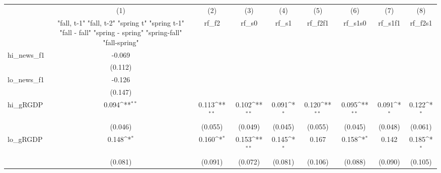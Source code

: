 {
\def\sym#1{\ifmmode^{#1}\else\(^{#1}\)\fi}
\begin{tabular}{l*{8}{c}}
\toprule
            &\multicolumn{1}{c}{(1)}&\multicolumn{1}{c}{(2)}&\multicolumn{1}{c}{(3)}&\multicolumn{1}{c}{(4)}&\multicolumn{1}{c}{(5)}&\multicolumn{1}{c}{(6)}&\multicolumn{1}{c}{(7)}&\multicolumn{1}{c}{(8)}\\
            &\multicolumn{1}{c}{  "fall, t-1" "fall, t-2" "spring t" "spring t-1"  "fall - fall" "spring - spring" "spring-fall" "fall-spring" }&\multicolumn{1}{c}{rf\_f2}&\multicolumn{1}{c}{rf\_s0}&\multicolumn{1}{c}{rf\_s1}&\multicolumn{1}{c}{rf\_f2f1}&\multicolumn{1}{c}{rf\_s1s0}&\multicolumn{1}{c}{rf\_s1f1}&\multicolumn{1}{c}{rf\_f2s1}\\
\midrule
hi\_news\_f1  &      -0.069         &                     &                     &                     &                     &                     &                     &                     \\
            &     (0.112)         &                     &                     &                     &                     &                     &                     &                     \\
\addlinespace
lo\_news\_f1  &      -0.126         &                     &                     &                     &                     &                     &                     &                     \\
            &     (0.147)         &                     &                     &                     &                     &                     &                     &                     \\
\addlinespace
hi\_gRGDP    &       0.094\sym{**} &       0.113\sym{**} &       0.102\sym{**} &       0.091\sym{*}  &       0.120\sym{**} &       0.095\sym{**} &       0.091\sym{*}  &       0.122\sym{*}  \\
            &     (0.046)         &     (0.055)         &     (0.049)         &     (0.045)         &     (0.055)         &     (0.045)         &     (0.048)         &     (0.061)         \\
\addlinespace
lo\_gRGDP    &       0.148\sym{*}  &       0.160\sym{*}  &       0.153\sym{**} &       0.145\sym{*}  &       0.167         &       0.158\sym{*}  &       0.142         &       0.185\sym{*}  \\
            &     (0.081)         &     (0.091)         &     (0.072)         &     (0.081)         &     (0.106)         &     (0.088)         &     (0.090)         &     (0.105)         \\

\end{tabular}}
